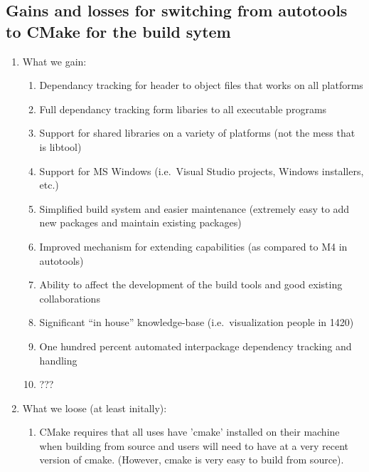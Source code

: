 \documentclass[pdf,ps2pdf,11pt]{SANDreport}
\begin{document}
%
\subsection{Gains and losses for switching from autotools to CMake for the build sytem}
%

\begin{enumerate}

{}\item What we gain:

  \begin{enumerate}

  {}\item Dependancy tracking for header to object files that works on
  all platforms

  {}\item Full dependancy tracking form libaries to all executable
  programs

  {}\item Support for shared libraries on a variety of platforms (not
  the mess that is libtool)

  {}\item Support for MS Windows (i.e.\ Visual Studio projects,
  Windows installers, etc.)

  {}\item Simplified build system and easier maintenance (extremely
  easy to add new packages and maintain existing packages)

  {}\item Improved mechanism for extending capabilities (as compared
  to M4 in autotools)

  {}\item Ability to affect the development of the build tools
  and good existing collaborations

  {}\item Significant ``in house'' knowledge-base (i.e.\ visualization
  people in 1420)

  {}\item One hundred percent automated interpackage dependency
  tracking and handling

  {}\item ???

  \end{enumerate}

{}\item What we loose (at least initally):

  \begin{enumerate}

  {}\item CMake requires that all uses have 'cmake' installed on their
  machine when building from source and users will need to have at a
  very recent version of cmake. (However, cmake is very easy to build
  from source).

  \end{enumerate}

\end{enumerate}
\end{document}
